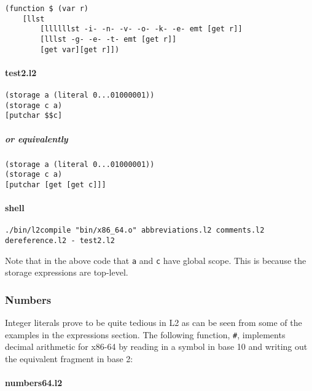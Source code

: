 \documentclass[]{article}
\let\oldparagraph\paragraph
\renewcommand{\paragraph}[1]{\oldparagraph{#1}\mbox{}}
\let\oldsubparagraph\subparagraph
\renewcommand{\subparagraph}[1]{\oldsubparagraph{#1}\mbox{}}
\begin{document}
\begin{verbatim}
(function $ (var r)
    [llst
        [llllllst -i- -n- -v- -o- -k- -e- emt [get r]]
        [lllst -g- -e- -t- emt [get r]]
        [get var][get r]])
\end{verbatim}

\hypertarget{test2.l2}{%
\paragraph{test2.l2}\label{test2.l2}}

\begin{verbatim}
(storage a (literal 0...01000001))
(storage c a)
[putchar $$c]
\end{verbatim}

\hypertarget{or-equivalently}{%
\subparagraph{or equivalently}\label{or-equivalently}}

\begin{verbatim}
(storage a (literal 0...01000001))
(storage c a)
[putchar [get [get c]]]
\end{verbatim}

\hypertarget{shell-1}{%
\paragraph{shell}\label{shell-1}}

\begin{verbatim}
./bin/l2compile "bin/x86_64.o" abbreviations.l2 comments.l2 dereference.l2 - test2.l2
\end{verbatim}

Note that in the above code that \texttt{a} and \texttt{c} have global
scope. This is because the storage expressions are top-level.

\hypertarget{numbers}{%
\subsubsection{Numbers}\label{numbers}}

Integer literals prove to be quite tedious in L2 as can be seen from
some of the examples in the expressions section. The following function,
\texttt{\#}, implements decimal arithmetic for x86-64 by reading in a
symbol in base 10 and writing out the equivalent fragment in base 2:

\hypertarget{numbers64.l2}{%
\paragraph{numbers64.l2}\label{numbers64.l2}}
\end{document}
